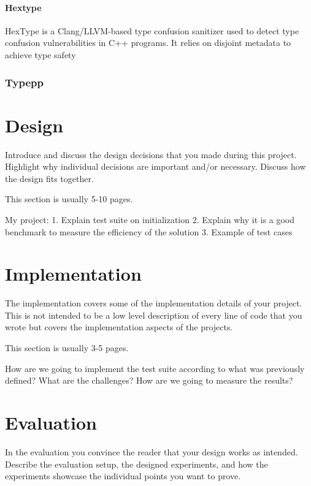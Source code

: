 \documentclass[a4paper,11pt,oneside]{report}
\begin{document}
\subsubsection{Hextype}

HexType is a Clang/LLVM-based type confusion sanitizer used to detect type confusion vulnerabilities in C++ programs. It relies on disjoint metadata to achieve type safety 

\subsection{Typepp}

\chapter{Design}

Introduce and discuss the design decisions that you made during this project.
Highlight why individual decisions are important and/or necessary. Discuss
how the design fits together.

This section is usually 5-10 pages.

My project:
1. Explain test suite on initialization 
2. Explain why it is a good benchmark to measure the efficiency of the solution
3. Example of test cases


\chapter{Implementation}

The implementation covers some of the implementation details of your project.
This is not intended to be a low level description of every line of code that
you wrote but covers the implementation aspects of the projects.

This section is usually 3-5 pages.

How are we going to implement the test suite according to what was previously defined? What are the challenges? 
How are we going to measure the results?


\chapter{Evaluation}

In the evaluation you convince the reader that your design works as intended.
Describe the evaluation setup, the designed experiments, and how the
experiments showcase the individual points you want to prove.
\end{document}
